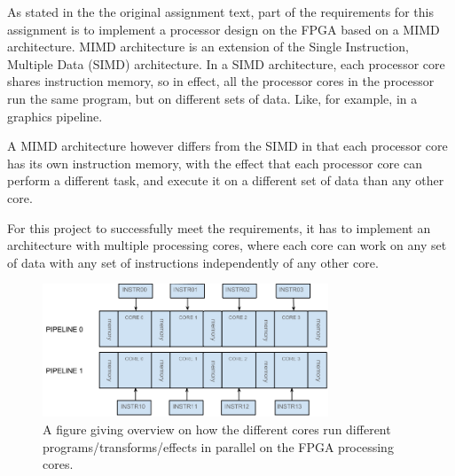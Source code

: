As stated in the the original assignment text, part of the requirements for this
assignment is to implement a processor design on the FPGA based on a MIMD
architecture. MIMD architecture is an extension of the Single Instruction,
Multiple Data (SIMD) architecture. In a SIMD architecture, each processor core
shares instruction memory, so in effect, all the processor cores in the
processor run the same program, but on different sets of data. Like, for example,
in a graphics pipeline.

A MIMD architecture however differs from the SIMD in that each processor core
has its own instruction memory, with the effect that each processor core can
perform a different task, and execute it on a different set of data than any
other core.

For this project to successfully meet the requirements, it has to implement
an architecture with multiple processing cores, where each core can work on any
set of data with any set of instructions independently of any other core.

\begin{figure}[H]
    \centering
    \includegraphics[height=150px]{figures/fpga/system_components_general_pipeline_without_programs.png}
    \caption{A figure giving overview on how the different cores run
different programs/transforms/effects in parallel on the FPGA processing cores.}
    \label{fig:general_pipeline}
\end{figure}
